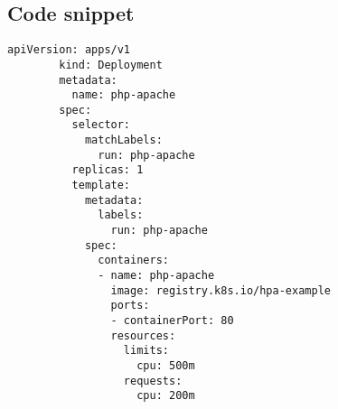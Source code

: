 \documentclass[
    11pt, %
]{beamer}
\begin{document}
\subsection{Code snippet}
\begin{frame}[fragile]
	\begin{lstlisting}[basicstyle=\tiny\ttfamily]
		apiVersion: apps/v1
		kind: Deployment
		metadata:
		  name: php-apache
		spec:
		  selector:
			matchLabels:
			  run: php-apache
		  replicas: 1
		  template:
			metadata:
			  labels:
				run: php-apache
			spec:
			  containers:
			  - name: php-apache
				image: registry.k8s.io/hpa-example
				ports:
				- containerPort: 80
				resources:
				  limits:
					cpu: 500m
				  requests:
					cpu: 200m
	\end{lstlisting}
\end{frame}
\end{document}
